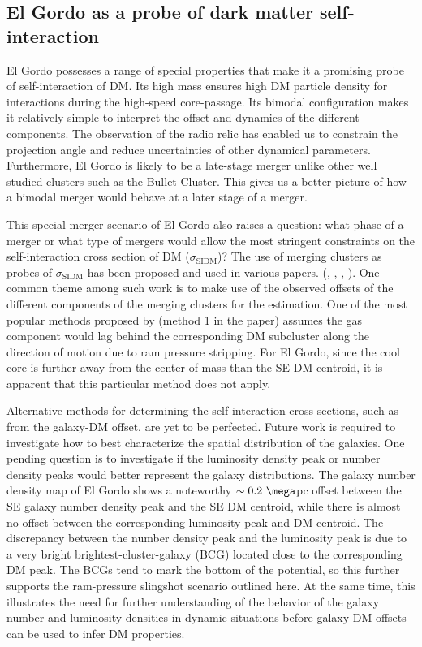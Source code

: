 \documentclass[letterpaper,useAMS,usenatbib]{mn2e}
\begin{document}
\subsection{El Gordo as a probe of dark matter self-interaction}
El Gordo possesses a range of special properties that make it a promising
probe of self-interaction of DM. Its high mass ensures high DM
particle density for interactions during the high-speed core-passage. Its bimodal configuration makes it
relatively simple to interpret the offset and dynamics of the different
components. The observation of the radio relic has enabled us to
constrain the projection angle and reduce uncertainties of other dynamical
parameters. Furthermore, El Gordo is likely to be a late-stage merger
unlike other well studied clusters such as the Bullet Cluster. This gives
us a better picture of how a bimodal merger would behave at a later stage of a merger. \par 
This special merger scenario of El Gordo also raises a question: what phase
of a merger or what type of mergers would allow the most stringent
constraints on the self-interaction cross section of DM ($\sigma_{\text{SIDM}}$)? 
The use of merging clusters as probes of $\sigma_{\text{SIDM}}$ 
has been proposed and used in various papers.
(\citealt{Markevitch2004}, \citealt{Randall2008d}, \citealt{Merten2011},
\citealt{Dawson12}). One common theme among such work is
to make use of the observed offsets of the different components of the
merging clusters for the estimation. One of the most popular methods proposed by
\citealt{Markevitch2004} (method 1 in the paper) assumes the gas component would lag behind the corresponding DM
subcluster along the direction of motion due to ram pressure stripping.   
For El Gordo, since the cool core is further away from the
center of mass than the SE DM centroid, it is apparent that this particular
method does not apply.\par 
Alternative methods for determining the self-interaction cross sections,
such as from the galaxy-DM offset, are yet to be perfected. Future work is
required to investigate how to best characterize the spatial distribution
of the galaxies. One pending question is to investigate if the luminosity
density peak or number density peaks would better represent the galaxy
distributions. The galaxy number density map of El Gordo
 shows a noteworthy $\sim0.2~\mega$pc offset between the SE
galaxy number density peak and the SE DM centroid, while there is almost no offset
between the corresponding luminosity peak and DM centroid. The discrepancy
between the number density peak and the luminosity peak is due to a very
bright brightest-cluster-galaxy (BCG) located close to the corresponding DM peak.
The BCGs tend to mark the bottom of the potential, so this further supports the
ram-pressure slingshot scenario outlined here. At the same time, this
illustrates the need for further understanding of the behavior of the
galaxy number and luminosity densities in dynamic situations before
galaxy-DM offsets can be used to infer DM properties. 
\par 
\end{document}
